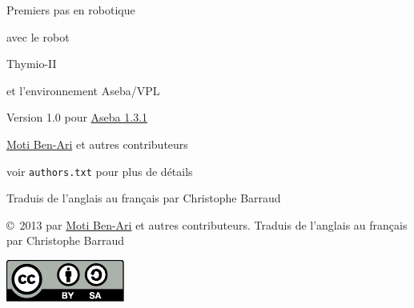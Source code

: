 \thispagestyle{empty}

\begin{center}
\begin{LARGE}
\begin{bfseries}
Premiers pas en robotique

avec le robot

Thymio-II

et l'environnement
\vspace{0.5cm}
Aseba/VPL
\end{bfseries}
\end{LARGE}

\bigskip\bigskip

\begin{Large}
Version 1.0 pour \href{https://aseba.wikidot.com/en:downloadinstall}{Aseba 1.3.1}
\end{Large}

\bigskip\bigskip

\begin{LARGE}
\href{http://www.weizmann.ac.il/sci-tea/benari/}{Moti Ben-Ari} et autres contributeurs\\
\end{LARGE}
\bigskip
\begin{Large}
voir \texttt{authors.txt} pour plus de détails
\end{Large}

\vspace{1cm}

\begin{Large}
Traduis de l'anglais au français par Christophe Barraud
\end{Large}

\bigskip


\end{center}

\vfill

\begin{center}
\copyright{}\  2013 par \href{http://www.weizmann.ac.il/sci-tea/benari/}{Moti Ben-Ari} et autres contributeurs. Traduis de l'anglais au français par Christophe Barraud
\end{center}


\begin{center}
\includegraphics[width=.2\textwidth]{../images/by-sa}
\end{center}

\thispagestyle{empty}
